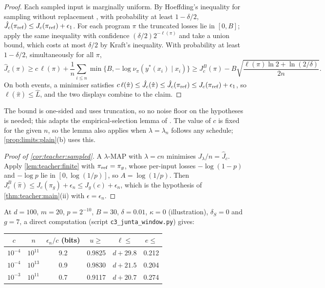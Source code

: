 \begin{proof}
Each sampled input is marginally uniform. By Hoeffding's inequality for sampling without replacement \citep{hoeffding1963probability}, with probability at least $1-\delta/2$, $\hat J_c(\pi_{\rm ref})\le J_c(\pi_{\rm ref})+\epsilon_1$. For each program $\pi$ the truncated losses lie in $[0,B]$; apply the same inequality with confidence $(\delta/2)2^{-\ell(\pi)}$ and take a union bound, which costs at most $\delta/2$ by Kraft's inequality. With probability at least $1-\delta/2$, simultaneously for all $\pi$,
\[
\hat J_c(\pi)\ge c\,\ell(\pi)+\frac1n\sum_{i\le n}\min\{B,-\log\nu_\pi(y^*(x_i)\mid x_i)\}\ge J^B_c(\pi)-B\sqrt{\frac{\ell(\pi)\ln2+\ln(2/\delta)}{2n}}.
\]
On both events, a minimiser satisfies $c\,\ell(\hat\pi)\le\hat J_c(\hat\pi)\le\hat J_c(\pi_{\rm ref})\le J_c(\pi_{\rm ref})+\epsilon_1$, so $\ell(\hat\pi)\le\hat L$, and the two displays combine to the claim.
\end{proof}

The bound is one-sided and uses truncation, so no noise floor on the hypotheses is needed; this adapts the empirical-selection lemma of \citet[section ``Simplicity and normativity from imitation'']{claude2026whatfollows}. The value of $c$ is fixed for the given $n$, so the lemma also applies when $\lambda=\lambda_n$ follows any schedule; \cref{prop:limits:plain}(b) uses this.

\begin{proof}[Proof of \cref{cor:teacher:sampled}]
A $\lambda$-MAP with $\lambda=cn$ minimises $J_\lambda/n=\hat J_c$. Apply \cref{lem:teacher:finite} with $\pi_{\rm ref}=\pi_g$, whose per-input losses $-\log(1-p)$ and $-\log p$ lie in $[0,\log(1/p)]$, so $A=\log(1/p)$. Then $J^B_c(\hat\pi)\le J_c(\pi_g)+\epsilon_n\le J_g(c)+\epsilon_n$, which is the hypothesis of \cref{thm:teacher:main}(ii) with $\epsilon=\epsilon_n$.
\end{proof}

At $d=100$, $m=20$, $p=2^{-10}$, $B=30$, $\delta=0.01$, $\kappa=0$ (illustration), $\delta_S=0$ and $g=7$, a direct computation (script \texttt{c3\_\allowbreak{}junta\_\allowbreak{}window.py}) gives:

\begin{center}\small
\begin{tabular}{@{}cc|cccc@{}}
\toprule
$c$ & $n$ & $\epsilon_n/c$ (bits) & $u\ge$ & $\ell\le$ & $e\le$\\
\midrule
$10^{-4}$ & $10^{11}$ & 9.2 & 0.9825 & $d+29.8$ & 0.212\\
$10^{-4}$ & $10^{13}$ & 0.9 & 0.9830 & $d+21.5$ & 0.204\\
$10^{-3}$ & $10^{11}$ & 0.7 & 0.9117 & $d+20.7$ & 0.274\\
\bottomrule
\end{tabular}
\end{center}

